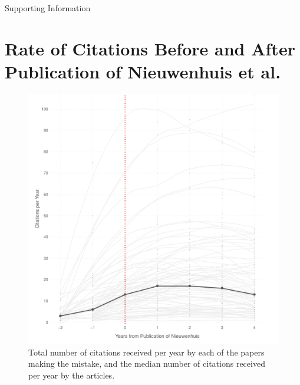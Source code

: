\documentclass[12pt, letterpaper]{article}
\begin{document}
\begin{center}
\Large{Supporting Information}
\end{center}

\section{Rate of Citations Before and After Publication of Nieuwenhuis et al.}

\begin{figure}[H]
\centering
\includegraphics[scale=.7]{../figs/nw_median_growth_curve.pdf}
\caption{Total number of citations received per year by each of the papers making the mistake, and the median number of citations received per year by the articles.}
\label{fig:median_niewenhuis}
\end{figure}
\end{document}
